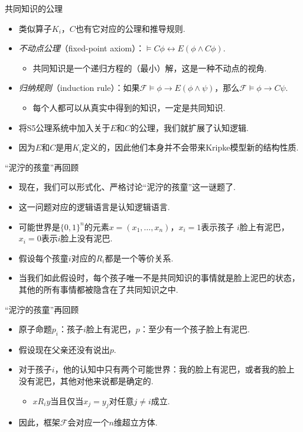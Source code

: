 {共同知识的公理}
\begin{itemize}
    \item 类似算子$K_i$，$C$也有它对应的公理和推导规则.
    \item \emph{不动点公理}（fixed-point axiom）：$\vDash C\phi\leftrightarrow E(\phi\wedge C\phi)$.
    \begin{itemize}
        \item 共同知识是一个递归方程的（最小）解，这是一种不动点的视角.
    \end{itemize}
    \item \emph{归纳规则}（induction rule）：如果$\mathcal F\vDash \phi\to E(\phi\wedge\psi)$，那么$\mathcal  F\vDash \phi\to C\psi$.
    \begin{itemize}
        \item 每个人都可以从真实中得到的知识，一定是共同知识.
    \end{itemize}
    \item 将S5公理系统中加入关于$E$和$C$的公理，我们就扩展了认知逻辑. 
    \item 因为$E$和$C$是用$K_i$定义的，因此他们本身并不会带来Kripke模型新的结构性质.
\end{itemize}


{“泥泞的孩童”再回顾}
\begin{itemize}
    \item 现在，我们可以形式化、严格讨论“泥泞的孩童”这一谜题了.
    \item 这一问题对应的逻辑语言是认知逻辑语言.
    \item 可能世界是$\{0,1\}^n$的元素$x=(x_1,\dots,x_n)$，$x_i=1$表示孩子
    $i$脸上有泥巴，$x_i=0$表示$i$脸上没有泥巴.
    \item 假设每个孩童$i$对应的$R_i$都是一个等价关系.
    \item 当我们如此假设时，每个孩子唯一不是共同知识的事情就是脸上泥巴的状态，其他的所有事情都被隐含在了共同知识之中.
\end{itemize}


{“泥泞的孩童”再回顾}
\begin{itemize}
    \item 原子命题$p_i$：孩子$i$脸上有泥巴，$p$：至少有一个孩子脸上有泥巴.
    \item 假设现在父亲还没有说出$p$.
    \item 对于孩子$i$，他的认知中只有两个可能世界：我的脸上有泥巴，或者我的脸上没有泥巴，其他对他来说都是确定的.
    \begin{itemize}
        \item $x R_i y$当且仅当$x_j=y_j$对任意$j\neq i$成立.
    \end{itemize}
    \item 因此，框架$\mathcal F$会对应一个$n$维超立方体.
\end{itemize}


